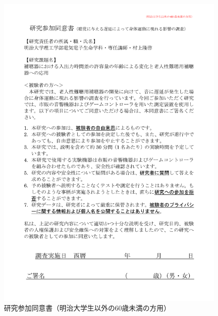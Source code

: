 \begin{figure}[ht]
  \centering
  \includegraphics[scale=0.55]{furoku_A/Douisyo_Not60NotMeiji.pdf}
  \caption{研究参加同意書（明治大学生以外の60歳未満の方用）}
\end{figure}
